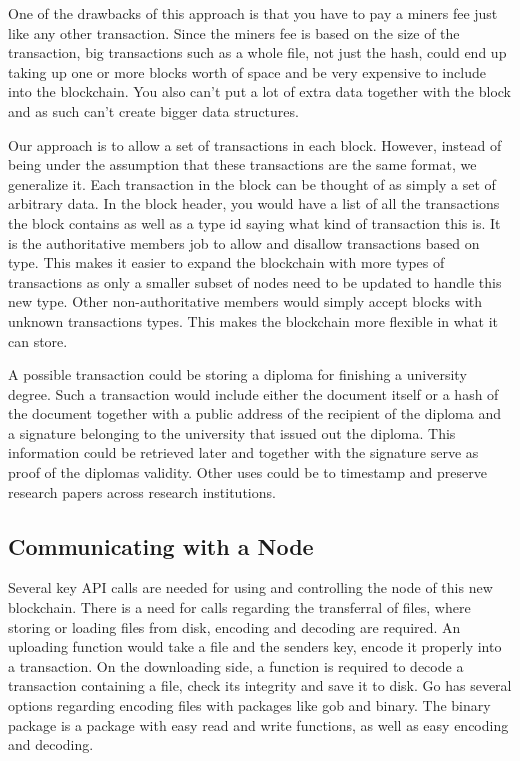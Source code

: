 \documentclass[12pt]{article}
\begin{document}
One of the drawbacks of this approach is that you have to pay a miners fee just like any other transaction. Since the miners fee is based on the size of the transaction, big transactions such as a whole file, not just the hash, could end up taking up one or more blocks worth of space and be very expensive to include into the blockchain. You also can't put a lot of extra data together with the block and as such can't create bigger data structures.

Our approach is to allow a set of transactions in each block. However, instead of being under the assumption that these transactions are the same format, we generalize it. Each transaction in the block can be thought of as simply a set of arbitrary data. In the block header, you would have a list of all the transactions the block contains as well as a type id saying what kind of transaction this is. It is the authoritative members job to allow and disallow transactions based on type. This makes it easier to expand the blockchain with more types of transactions as only a smaller subset of nodes need to be updated to handle this new type. Other non-authoritative members would simply accept blocks with unknown transactions types. This makes the blockchain more flexible in what it can store.


A possible transaction could be storing a diploma for finishing a university degree. Such a transaction would include either the document itself or a hash of the document together with a public address of the recipient of the diploma and a signature belonging to the university that issued out the diploma. This information could be retrieved later and together with the signature serve as proof of the diplomas validity. Other uses could be to timestamp and preserve research papers across research institutions. 

\subsection{Communicating with a Node}
 
Several key API calls are needed for using and controlling the node of this new blockchain. There is a need for calls regarding the transferral of files, where storing or loading files from disk, encoding and decoding are required. An uploading function would take a file and the senders key, encode it properly into a transaction. On the downloading side, a function is required to decode a transaction containing a file, check its integrity and save it to disk. Go has several options regarding encoding files with  packages like gob and binary. The binary package is a package with easy read and write functions, as well as easy encoding and decoding. %
\end{document}
